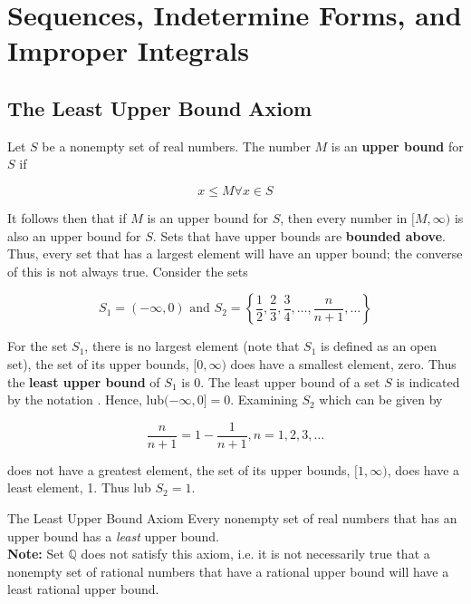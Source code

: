 \section{Sequences, Indetermine Forms, and Improper Integrals}  %


    \subsection{The Least Upper Bound Axiom}    %

        Let $S$ be a nonempty set of real numbers. The number $M$ is an \textbf{upper bound} for $S$ if

        \[
            x \leq M \forall x \in S
        \]

        It follows then that if $M$ is an upper bound for $S$, then every number in $[M,\infty)$ is also an upper bound for $S$. Sets that have upper bounds are \textbf{bounded above}. Thus, every set that has a largest
        element will have an upper bound; the converse of this is not always true. Consider the sets

        \[
            S_1 = (-\infty, 0) \text{ and } S_2 = \left\{\frac{1}{2}, \frac{2}{3}, \frac{3}{4}, \dots , \frac{n}{n+1},\dots\right\}
        \]

        For the set $S_1$, there is no largest element (note that $S_1$ is defined as an open set), the set of its upper bounds, $[0,\infty)$ does have a smallest element, zero. Thus the \textbf{least upper bound} of
        $S_1$ is 0. The least upper bound of a set $S$ is indicated by the notation . Hence, lub$(-\infty, 0]=0$. Examining $S_2$ which can be given by

        \[
            \frac{n}{n+1} = 1 - \frac{1}{n+1}, n = 1,2,3,\dots
        \]

        does not have a greatest element, the set of its upper bounds, $[1,\infty)$, does have a least element, 1. Thus lub $S_2=1$.

        \begin{axiom}{The Least Upper Bound Axiom}
            Every nonempty set of real numbers that has an upper bound has a \textit{least} upper bound. \\

            \textbf{Note:} Set $\mathbb{Q}$ does not satisfy this axiom, i.e. it is not necessarily true that a nonempty set of rational numbers that have a rational upper bound will have a least rational upper bound.
        \end{axiom}

